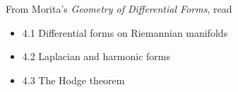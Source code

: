 \documentclass{homework}
\author{Jim Fowler}
\date{Week 10: Harmonic forms}
\begin{document}
\maketitle

From Morita's \textit{Geometry of Differential Forms}, read
\begin{itemize}
\item 4.1 Differential forms on Riemannian manifolds
\item 4.2 Laplacian and harmonic forms
\item 4.3 The Hodge theorem
\end{itemize}
\end{document}

